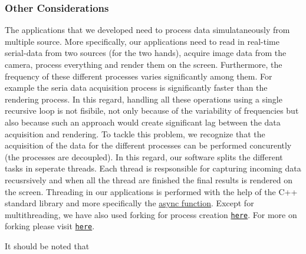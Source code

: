\subsubsection{Other Considerations}
The applications that we developed need to process data simulataneously from 
multiple source. More specifically, our applications need to read in real-time
serial-data from two sources (for the two hands), acquire image 
data from the camera, process everything and render them on the screen. 
Furthermore, the frequency of these different processes varies significantly 
among them. For example the seria data acquisition process is significantly 
faster than the rendering process. In this regard, handling 
all these operations using a single recursive loop is not fisibile, not 
only because of the variability of frequencies but also because such an 
approach would create significant lag between the data acquisition and rendering.
To tackle this problem, we recognize that the acquisition of the data for 
the different processes can be performed concurently (the processes are decoupled).
In this regard, our software splits the different tasks in seperate threads. 
Each thread is respsonsible for capturing incoming data recusrsively
and when all the thread are finished the final results is rendered on the
screen. Threading in our applications is performed with the help of the 
C++ standard library and more specifically the
\href{https://en.cppreference.com/w/cpp/thread/async}{async function}.
Except for multithreading, we have also used forking for process creation
\texttt{\href{https://github.com/amartsop/SkeletalAnimationMultiThreadFace/blob/master/main.cpp}{here}}.
For more on forking please visit 
\texttt{\href{https://man7.org/linux/man-pages/man2/fork.2.html}{here}}.

It should be noted that 

